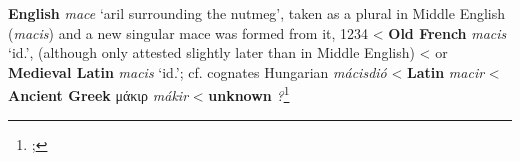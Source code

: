 \begin{etymology}\label{ety:mace}
\textbf{English} \textit{mace} `aril surrounding the nutmeg', taken as a plural in Middle English (\textit{macis}) and a new singular mace was formed from it, 1234
< \textbf{Old French} \textit{macis} `id.', (although only attested slightly later than in Middle English)
< or \textbf{Medieval Latin} \textit{macis} `id.'; cf. cognates Hungarian \textit{mácisdió}
< \textbf{Latin} \textit{macir}
< \textbf{Ancient Greek} {μάκιρ} \textit{mákir}
< \textbf{unknown} \textit{?}\footnote{; }
\end{etymology}